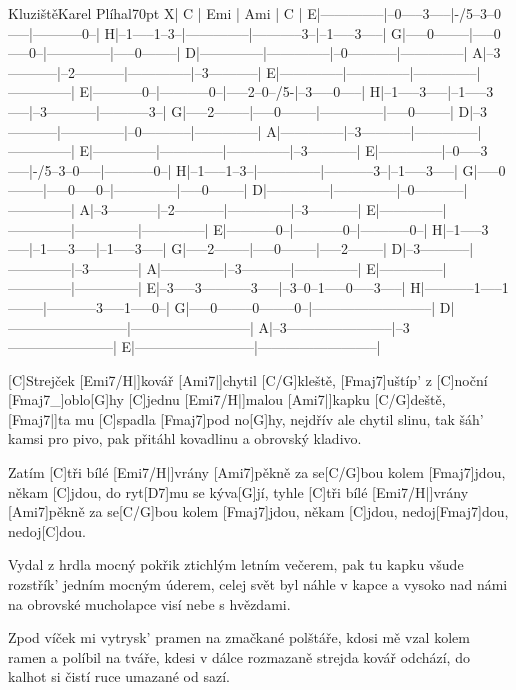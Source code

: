 \begin{song}{Kluziště}{Karel Plíhal}{70pt}
\tabs{20pt}
X|  C           | Emi          | Ami          |  C           |
E|--------------|--0-----3-----|-/5--3--0-----|-----------0--|
H|--1-----1--3--|--------------|-----------3--|--1-----3-----|
G|-----0--------|-----0-----0--|--------------|-----0--------|
D|--------------|--------------|--0-----------|--------------|
A|--3-----------|--2-----------|--------------|--3-----------|
E|--------------|--------------|--------------|--------------|
\endtabs
\tabs{20pt}
E|-----------0--|-----------0--|-----2--0--/5-|--3-----0-----|
H|--1-----3-----|--1-----3-----|--3-----------|-----------3--|
G|-----2--------|-----0--------|--------------|-----0--------|
D|--3-----------|--------------|--0-----------|--------------|
A|--------------|--3-----------|--------------|--------------|
E|--------------|--------------|--------------|--3-----------|
\endtabs
\tabs{20pt}
E|--------------|--0-----3-----|-/5--3--0-----|-----------0--|
H|--1-----1--3--|--------------|-----------3--|--1-----3-----|
G|-----0--------|-----0-----0--|--------------|-----0--------|
D|--------------|--------------|--0-----------|--------------|
A|--3-----------|--2-----------|--------------|--3-----------|
E|--------------|--------------|--------------|--------------|
\endtabs
\tabs{20pt}
E|-----------0--|-----------0--|-----------0--|
H|--1-----3-----|--1-----3-----|--1-----3-----|
G|-----2--------|-----0--------|-----2--------|
D|--3-----------|--------------|--3-----------|
A|--------------|--3-----------|--------------|
E|--------------|--------------|--------------|
\endtabs
\tabs{20pt}
E|--3-----3-----------3-----|--3--0--1-----0-----3-----|
H|-----------1-----1--------|-----------3-----1-----0--|
G|-----0--------0--------0--|--------------------------|
D|--------------------------|--------------------------|
A|--3-----------------------|--3-----------------------|
E|--------------------------|--------------------------|
\endtabs

%
[C]Strejček [Emi7/H|]{kovář} [Ami7|]{chytil} [C/G]kleště, [Fmaj7]{uštíp'} z [C]noční [Fmaj7_]{oblo}[G]hy
[C]jednu [Emi7/H|]{malou} [Ami7|]{kapku} [C/G]deště, [Fmaj7|]{ta mu} [C]spadla [Fmaj7]pod no[G]hy,
nejdřív ale chytil slinu, tak šáh' kamsi pro pivo,
pak přitáhl kovadlinu a obrovský kladivo.

\chorus%
Zatím [C]tři bílé [Emi7/H|]{vrány} [Ami7]pěkně za se[C/G]bou
kolem [Fmaj7]jdou, někam [C]jdou, do ryt[D7]mu se kýva[G]jí,
tyhle [C]tři bílé [Emi7/H|]{vrány} [Ami7]pěkně za se[C/G]bou
kolem [Fmaj7]jdou, někam [C]jdou, nedoj[Fmaj7]dou, nedoj[C]dou.

%
Vydal z hrdla mocný pokřik ztichlým letním večerem,
pak tu kapku všude rozstřík' jedním mocným úderem,
celej svět byl náhle v kapce a vysoko nad námi
na obrovské mucholapce visí nebe s hvězdami.
\repchor

%
Zpod víček mi vytrysk' pramen na zmačkané polštáře,
kdosi mě vzal kolem ramen a políbil na tváře,
kdesi v dálce rozmazaně strejda kovář odchází,
do kalhot si čistí ruce umazané od sazí.
\end{song}
\vfil
\hfil{}
